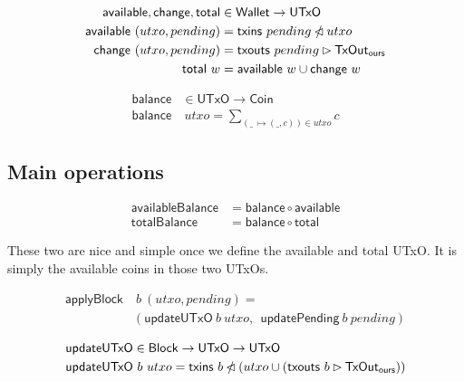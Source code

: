 \documentclass{article}
\newcommand{\restrictdom}{\lhd}
\newcommand{\subtractdom}{\mathbin{\slashed{\restrictdom}}}
\newcommand{\restrictrange}{\rhd}
\begin{document}
\begin{equation}
\begin{split}
\mathsf{available}, \mathsf{change}, \mathsf{total} & \in \mathsf{Wallet} \to \mathsf{UTxO} \\
\mathsf{available} ~ (utxo, pending) & = \mathsf{txins} ~ pending \subtractdom utxo \\
\mathsf{change} ~ (utxo, pending) & =
    \mathsf{txouts} ~ pending \restrictrange \mathsf{TxOut_{ours}} \\
\mathsf{total} ~ w & = \mathsf{available} ~ w \cup \mathsf{change} ~ w \\
\end{split}
\end{equation}

\begin{equation}
\begin{split}
\mathsf{balance}& \in \mathsf{UTxO} \to \mathsf{Coin} \\
\mathsf{balance}& ~ utxo = \sum_{(\_ ~ \mapsto (\_, c)) \in utxo} c
\end{split}
\end{equation}

\subsection{Main operations}
\label{sec:main_operations}

\begin{equation}
\begin{split}
\mathsf{availableBalance} & = \mathsf{balance} \circ \mathsf{available} \\
\mathsf{totalBalance}     & = \mathsf{balance} \circ \mathsf{total}
\end{split}
\end{equation}

These two are nice and simple once we define the available and total UTxO. It
is simply the available coins in those two UTxOs.

\begin{equation} \label{applyBlock_spec}
\begin{split}
\mathsf{applyBlock} & ~ b ~ (utxo, pending) = \\
                    & (\mathsf{updateUTxO} ~ b ~ utxo, ~~ \mathsf{updatePending} ~ b ~ pending)
\end{split}
\end{equation}

\begin{equation}
\begin{split}
\mathsf{updateUTxO} & \in \mathsf{Block} \to \mathsf{UTxO} \to \mathsf{UTxO} \\
\mathsf{updateUTxO} & ~ b ~ utxo = \mathsf{txins} ~ b \subtractdom (utxo \cup (\mathsf{txouts} ~ b \restrictrange \mathsf{TxOut_{ours}}))
\end{split}
\end{equation}
\end{document}

